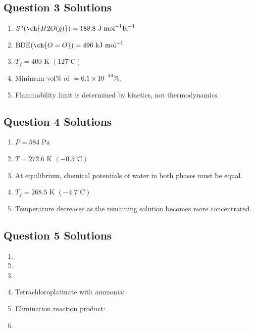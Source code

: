 \documentclass{article}
\begin{document}
\subsection*{Question 3 Solutions}
\begin{enumerate}[label=\alph*.]
    \item $S^\circ(\ch{H2O(g)}) = 188.8\text{ J mol}^{-1}\text{K}^{-1}$
    \item $\text{BDE}(\ch{O=O}) = 496\text{ kJ mol}^{-1}$
    \item $T_f = 400\text{ K } (127^\circ\text{C})$
    \item Minimum vol\% of  $= 6.1 \times 10^{-40}\%$.
    \item Flammability limit is determined by kinetics, not thermodynamics.
\end{enumerate}

\subsection*{Question 4 Solutions}
\begin{enumerate}[label=\alph*.]
    \item $P = 584\text{ Pa}$
    \item $T = 272.6\text{ K } (-0.5^\circ\text{C})$
    \item At equilibrium, chemical potentials of water in both phases must be equal.
    \item $T_f = 268.5\text{ K } (-4.7^\circ\text{C})$
    \item Temperature decreases as the remaining solution becomes more concentrated.
\end{enumerate}

\subsection*{Question 5 Solutions}
\begin{enumerate}[label=\alph*.]
    \item {}
    \item {}
    \item {}
    \item Tetrachloroplatinate with ammonia: \\
    \item Elimination reaction product: \\
    \item {}
\end{enumerate}
\end{document}
